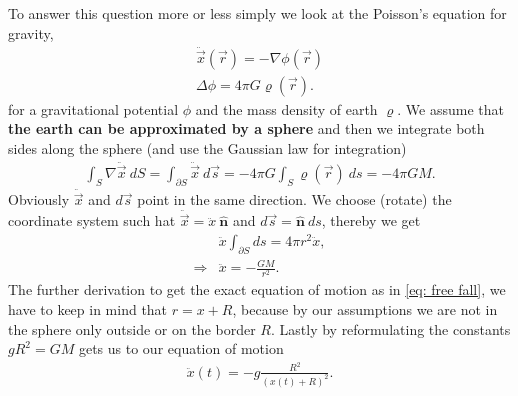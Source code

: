 \documentclass[a4paper]{article}
\begin{document}
To answer this question more or less simply we look at the Poisson's equation
for gravity,
\begin{align}
    \ddot{\vec{x}}(\vec{r}) = -\nabla \phi(\vec{r}) \\
    \Delta \phi = 4\pi G\varrho(\vec{r}).
\end{align}
for a gravitational potential $\phi$ and the mass density of earth
$\varrho$. We assume that \textbf{the earth can be approximated by a sphere}
and then we integrate both sides along the sphere (and use the Gaussian law
for integration)
\begin{align}
    \int_{S} \nabla \ddot{\vec{x}}\ dS =
    \int_{\partial S}\ddot{\vec{x}}\ d\vec{s} = -4\pi
    G \int_S\varrho(\vec{r})\ ds = -4\pi GM.
\end{align}
Obviously $\ddot{\vec{x}}$ and $d\vec{s}$ point in the same direction. We
choose (rotate) the coordinate system such hat $\ddot{\vec{x}} =
\ddot{x}\ \mathbf{\hat{n}}$ and $d\vec{s} = \mathbf{\hat{n}}\ ds$, thereby
we get
\begin{align}
    &\ddot{x}\int_{\partial S} ds = 4\pi r^2 \ddot{x},\\
    \Rightarrow &\ddot{x} = -\frac{GM}{r^2}.
\end{align}
The further derivation to get the exact equation of motion as in \ref{eq:
free fall}, we have to keep in mind that $r = x + R$, because by our
assumptions we are not in the sphere only outside or on the border $R$.
Lastly by reformulating the constants $gR^2 = GM$ gets us to our equation of
motion
\begin{align}
    \ddot{x}(t) = -g\frac{R^2}{(x(t) + R)^2}.
\end{align}
\end{document}
